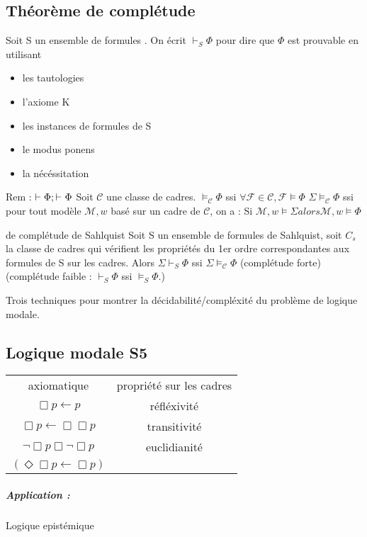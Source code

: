 \documentclass[10pt,a4paper]{article}
\newcommand{\F}{\mathcal{F}}
\begin{document}
\subsection{Théorème de complétude}

Soit S un ensemble de formules . On écrit $\vdash_S \Phi$ pour dire que $\Phi$ est prouvable en utilisant 
\begin{itemize}
 \item les tautologies
 \item l'axiome K
 \item les instances de formules de S
 \item le modus ponens
 \item la nécéssitation
\end{itemize}
Rem : $\vdash \Phi; \vdash_{\empty} \Phi$
Soit $\mathcal{C}$ une classe de cadres.
$\models_{\mathcal{C}} \Phi$ ssi $\forall \F \in \mathcal{C}, \F \models \Phi$
$\Sigma \models_{\mathcal{C}} \Phi$ ssi pour tout modèle $\mathcal{M}, w$ basé sur un cadre de $\mathcal{C}$, on a :
Si $\mathcal{M}, w \models \Sigma alors \mathcal{M}, w \models \Phi$

\begin{thm}{de complétude de Sahlquist}
Soit S un ensemble de formules de Sahlquist, soit $C_s$ la classe de cadres qui vérifient les propriétés du 1er ordre correspondantes aux formules de S sur les cadres.
Alors  $\Sigma \vdash_S \Phi$ ssi $\Sigma \models_{\mathcal{C}} \Phi$ (complétude forte)
(complétude faible : $\vdash_S \Phi$ ssi $\models_S \Phi$.)
\end{thm}

Trois techniques pour montrer la décidabilité/compléxité du problème de logique modale.

\subsection{Logique modale S5}
\begin{tabular}{c | c  }
 axiomatique & propriété sur les cadres \\
 $\Box p \leftarrow p$ & réfléxivité\\
 $\Box p \leftarrow \Box \Box p$ & transitivité\\
 $\lnot\Box p \Box \lnot \Box p$ & euclidianité\\
 $(\Diamond \Box p \leftarrow \Box p)$\\
\end{tabular}
\subparagraph{Application : } Logique epistémique
\end{document}
